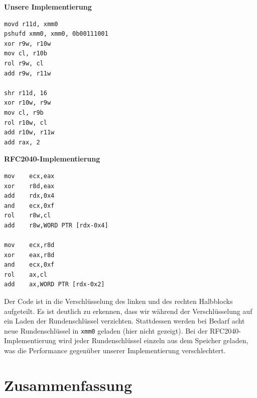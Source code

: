 \documentclass[course=erap]{aspdoc}
\begin{document}
\begin{multicols}{2}

\noindent \textbf{Unsere Implementierung}

\begin{verbatim}
movd r11d, xmm0
pshufd xmm0, xmm0, 0b00111001
xor r9w, r10w
mov cl, r10b
rol r9w, cl
add r9w, r11w

shr r11d, 16
xor r10w, r9w
mov cl, r9b
rol r10w, cl
add r10w, r11w
add rax, 2
\end{verbatim}

\noindent \textbf{RFC2040-Implementierung}

\begin{verbatim}
mov    ecx,eax
xor    r8d,eax
add    rdx,0x4
and    ecx,0xf
rol    r8w,cl
add    r8w,WORD PTR [rdx-0x4]

mov    ecx,r8d
xor    eax,r8d
and    ecx,0xf
rol    ax,cl
add    ax,WORD PTR [rdx-0x2]

\end{verbatim}

\end{multicols}

\noindent Der Code ist in die Verschlüsselung des linken und des rechten Halbblocks aufgeteilt. Es ist deutlich zu erkennen, dass wir während der Verschlüsselung auf ein Laden der Rundenschlüssel verzichten. Stattdessen werden bei Bedarf acht neue Rundenschlüssel in \texttt{xmm0} geladen (hier nicht gezeigt). Bei der RFC2040-Implementierung wird jeder Rundenschlüssel einzeln aus dem Speicher geladen, was die Performance gegenüber unserer Implementierung verschlechtert.

\section{Zusammenfassung}

\printbibliography
\end{document}
